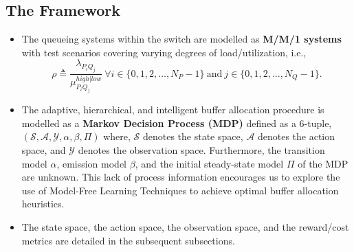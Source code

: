 \documentclass{article}
\begin{document}
\subsection{The Framework}
\begin{itemize}
    \item The queueing systems within the switch are modelled as \textbf{M/M/1 systems} with test scenarios covering varying degrees of load/utilization, i.e.,
    \begin{equation}
        \rho \triangleq \frac{\lambda_{P_i Q_j}}{\mu_{P_i Q_j}^{high|low}}\ \forall i \in \{0, 1, 2, \dots, N_P-1\}\ \text{and}\ j \in \{0, 1, 2, \dots, N_Q-1\}.
    \end{equation}
    \item The adaptive, hierarchical, and intelligent buffer allocation procedure is modelled as a \textbf{Markov Decision Process (MDP)} defined as a 6-tuple, \\$(\mathcal{S}, \mathcal{A}, \mathcal{Y}, \alpha, \beta, \Pi)$ where, $\mathcal{S}$ denotes the state space, $\mathcal{A}$ denotes the action space, and $\mathcal{Y}$ denotes the observation space. Furthermore, the transition model $\alpha$, emission model $\beta$, and the initial steady-state model $\Pi$ of the MDP are unknown. This lack of process information encourages us to explore the use of Model-Free Learning Techniques to achieve optimal buffer allocation heuristics.
    \item The state space, the action space, the observation space, and the reward/cost metrics are detailed in the subsequent subsections.
\end{itemize}
\end{document}
